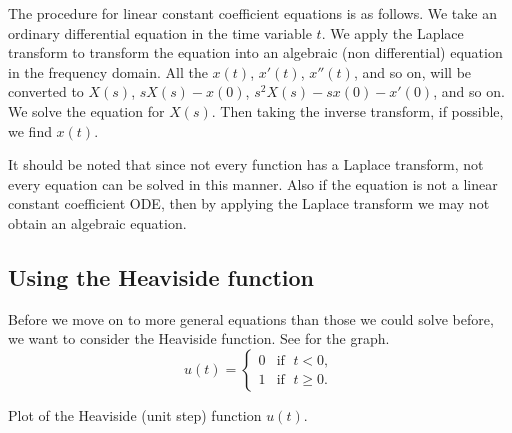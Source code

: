 \documentclass{ximera}
\begin{document}
The procedure for linear constant coefficient equations is as follows. We take an ordinary differential equation in the time variable $t$.  We apply the Laplace transform to transform the equation into an algebraic (non differential) equation in the frequency domain.  All the $x(t)$, $x'(t)$, $x''(t)$, and so on, will be converted to $X(s)$, $sX(s) - x(0)$, $s^2X(s) - sx(0) - x'(0)$, and so on. We solve the equation for $X(s)$. Then taking the inverse transform, if possible, we find $x(t)$.

It should be noted that since not every function has a Laplace transform, not every equation can be solved in this manner.  Also if the equation is not a linear constant coefficient ODE\@, then by applying the Laplace transform we may not obtain an algebraic equation.

\subsection{Using the Heaviside function}

Before we move on to more general equations than those we could solve before, we want to consider the Heaviside function.  See  for the graph.
\begin{equation*}
    u(t) =
    \begin{cases}
        0 & \text{if } \; t < 0 , \\ 
        1 & \text{if } \; t \geq 0 .
    \end{cases}
\end{equation*}

\begin{myfig}
    \capstart
    \caption{Plot of the Heaviside (unit step) function $u(t)$.\label{lt:heavisidefig}}
\end{myfig}
\end{document}
